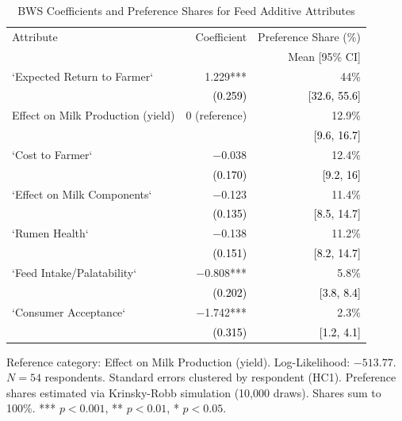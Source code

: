 \begin{table}[H]
\centering
\caption{BWS Coefficients and Preference Shares for Feed Additive Attributes}
\label{tab:support_bws}
\begin{threeparttable}
\begin{tabular}{lrr}
\toprule
Attribute & Coefficient & \multicolumn{1}{r}{Preference Share (\%)} \\
          &             & \multicolumn{1}{r}{Mean [95\% CI]} \\
\midrule
`Expected Return to Farmer` & 1.229*** & 44\% \\
 & {\small\textcolor{black}{(0.259)}} & {\small\textcolor{black}{[32.6, 55.6]}} \\
\addlinespace[4pt]
Effect on Milk Production (yield) & 0 (reference) & 12.9\% \\
 & {\small\textcolor{black}{}} & {\small\textcolor{black}{[9.6, 16.7]}} \\
\addlinespace[4pt]
`Cost to Farmer` & $-$0.038 & 12.4\% \\
 & {\small\textcolor{black}{(0.170)}} & {\small\textcolor{black}{[9.2, 16]}} \\
\addlinespace[4pt]
`Effect on Milk Components` & $-$0.123 & 11.4\% \\
 & {\small\textcolor{black}{(0.135)}} & {\small\textcolor{black}{[8.5, 14.7]}} \\
\addlinespace[4pt]
`Rumen Health` & $-$0.138 & 11.2\% \\
 & {\small\textcolor{black}{(0.151)}} & {\small\textcolor{black}{[8.2, 14.7]}} \\
\addlinespace[4pt]
`Feed Intake/Palatability` & $-$0.808*** & 5.8\% \\
 & {\small\textcolor{black}{(0.202)}} & {\small\textcolor{black}{[3.8, 8.4]}} \\
\addlinespace[4pt]
`Consumer Acceptance` & $-$1.742*** & 2.3\% \\
 & {\small\textcolor{black}{(0.315)}} & {\small\textcolor{black}{[1.2, 4.1]}} \\
\bottomrule
\end{tabular}
\begin{tablenotes}[flushleft]
\footnotesize
\item Reference category: Effect on Milk Production (yield). Log-Likelihood: $-513.77$. $N = 54$ respondents. Standard errors clustered by respondent (HC1). Preference shares estimated via Krinsky-Robb simulation (10{,}000 draws). Shares sum to 100\%. *** $p < 0.001$, ** $p < 0.01$, * $p < 0.05$.
\end{tablenotes}
\end{threeparttable}
\end{table}

